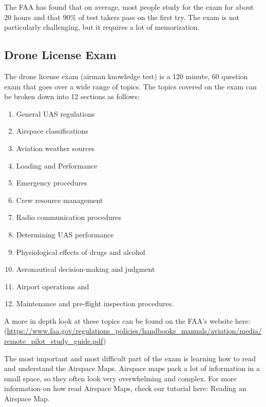 \documentclass[
  12pt,
]{book}
\providecommand{\tightlist}{%
  \setlength{\itemsep}{0pt}\setlength{\parskip}{0pt}}
\newenvironment{notebox}{
  \definecolor{shadecolor}{gray}{.8}  %
  \color{black}
  \begin{shaded}}
 {\end{shaded}}
\begin{document}
\begin{notebox}
The FAA has found that on average, most people study for the exam for about 20 hours and that 90\% of test takers pass on the first try. The exam is not particularly challenging, but it requires a lot of memorization.

\end{notebox}

\subsection{Drone License Exam}\label{drone-license-exam}

The drone license exam (airman knowledge test) is a 120 minute, 60 question exam that goes over a wide range of topics. The topics covered on the exam can be broken down into 12 sections as follows:

\begin{enumerate}
\def\labelenumi{\arabic{enumi}.}
\tightlist
\item
  General UAS regulations
\item
  Airspace classifications
\item
  Aviation weather sources
\item
  Loading and Performance
\item
  Emergency procedures
\item
  Crew resource management
\item
  Radio communication procedures
\item
  Determining UAS performance
\item
  Physiological effects of drugs and alcohol
\item
  Aeronautical decision-making and judgment
\item
  Airport operations
  and
\item
  Maintenance and pre-flight inspection procedures.
\end{enumerate}

A more in depth look at these topics can be found on the FAA's website here: (\url{https://www.faa.gov/regulations_policies/handbooks_manuals/aviation/media/remote_pilot_study_guide.pdf})

The most important and most difficult part of the exam is learning how to read and understand the Airspace Maps. Airspace maps pack a lot of information in a small space, so they often look very overwhelming and complex. For more information on how read Airspace Maps, check our tutorial here: Reading an Airspace Map.
\end{document}
